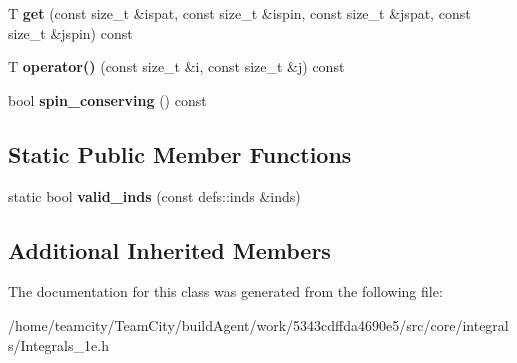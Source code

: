 \begin{DoxyCompactItemize}
\item 
T {\bfseries get} (const size\+\_\+t \&ispat, const size\+\_\+t \&ispin, const size\+\_\+t \&jspat, const size\+\_\+t \&jspin) const \hypertarget{classIntegrals__1e_ace36c264e10938617f6b262fe66586f3}{}\label{classIntegrals__1e_ace36c264e10938617f6b262fe66586f3}

\item 
T {\bfseries operator()} (const size\+\_\+t \&i, const size\+\_\+t \&j) const \hypertarget{classIntegrals__1e_ad7ff7890bc422115b27007babc99725e}{}\label{classIntegrals__1e_ad7ff7890bc422115b27007babc99725e}

\item 
bool {\bfseries spin\+\_\+conserving} () const \hypertarget{classIntegrals__1e_ac21957f0fdae210dd3eba4bad8610c70}{}\label{classIntegrals__1e_ac21957f0fdae210dd3eba4bad8610c70}

\end{DoxyCompactItemize}
\subsection*{Static Public Member Functions}
\begin{DoxyCompactItemize}
\item 
static bool {\bfseries valid\+\_\+inds} (const defs\+::inds \&inds)\hypertarget{classIntegrals__1e_a9c984d09434c3da1aeea59032ca7e802}{}\label{classIntegrals__1e_a9c984d09434c3da1aeea59032ca7e802}

\end{DoxyCompactItemize}
\subsection*{Additional Inherited Members}


The documentation for this class was generated from the following file\+:\begin{DoxyCompactItemize}
\item 
/home/teamcity/\+Team\+City/build\+Agent/work/5343cdffda4690e5/src/core/integrals/Integrals\+\_\+1e.\+h\end{DoxyCompactItemize}
